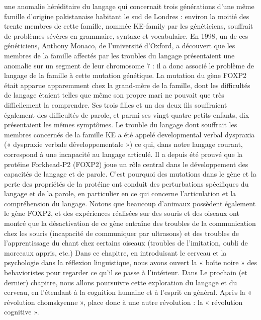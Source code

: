 une anomalie héréditaire du langage qui concernait trois générations d’une même famille d’origine
pakistanaise habitant le sud de Londres : environ la moitié des trente membres de cette famille,
nommée KE-family par les généticiens, souffrait de problèmes sévères en grammaire, syntaxe et
vocabulaire.
En 1998, un de ces généticiens, Anthony Monaco, de l’université d'Oxford, a découvert que
les membres de la famille affectés par les troubles du langage présentaient une anomalie sur un
segment de leur chromosome 7 : il a donc associé le problème de langage de la famille à cette
mutation génétique. La mutation du gène FOXP2 était apparue apparemment chez la grand-mère
de la famille, dont les difficultés de langage étaient telles que même son propre mari ne pouvait
que très difficilement la comprendre. Ses trois filles et un des deux fils souffraient également
des difficultés de parole, et parmi ses vingt-quatre petits-enfants, dix présentaient les mêmes
symptômes. Le trouble du langage dont souffrait les membres concernés de la famille KE a été
appelé developmental verbal dyspraxia (« dyspraxie verbale développementale ») ce qui, dans
notre langage courant, correspond à une incapacité au langage articulé.
Il a depuis été prouvé que la protéine Forkhead-P2 (FOXP2) joue un rôle central dans le
développement des capacités de langage et de parole. C’est pourquoi des mutations dans le gène et
la perte des propriétés de la protéine ont conduit des perturbations spécifiques du langage et de la
parole, en particulier en ce qui concerne l'articulation et la compréhension du langage.
Notons que beaucoup d'animaux possèdent également le gène FOXP2, et des expériences réalisées
sur des souris et des oiseaux ont montré que la désactivation de ce gène entraîne des troubles de
la communication chez les souris (incapacité de communiquer par ultrasons) et des troubles de
l'apprentissage du chant chez certains oiseaux (troubles de l’imitation, oubli de morceaux appris,
etc.)
Dans ce chapitre, en introduisant le cerveau et la psychologie dans la réflexion linguistique, nous
avons ouvert la « boîte noire » des behavioristes pour regarder ce qu'il se passe à l'intérieur. Dans
Le prochain (et dernier) chapitre, nous allons poursuivre cette exploration du langage et du cerveau,
en l'étendant à la cognition humaine et à l'esprit en général. Après la « révolution chomskyenne »,
place donc à une autre révolution : la « révolution cognitive ».


